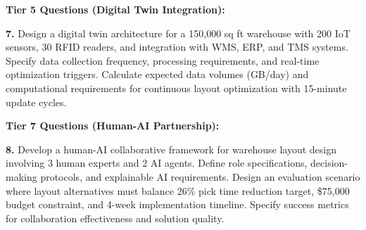\documentclass{article}
\begin{document}
\textbf{Tier 5 Questions (Digital Twin Integration):}

\textbf{7.} Design a digital twin architecture for a 150,000 sq ft warehouse with 200 IoT sensors, 30 RFID readers, and integration with WMS, ERP, and TMS systems. Specify data collection frequency, processing requirements, and real-time optimization triggers. Calculate expected data volumes (GB/day) and computational requirements for continuous layout optimization with 15-minute update cycles.

\textbf{Tier 7 Questions (Human-AI Partnership):}

\textbf{8.} Develop a human-AI collaborative framework for warehouse layout design involving 3 human experts and 2 AI agents. Define role specifications, decision-making protocols, and explainable AI requirements. Design an evaluation scenario where layout alternatives must balance 26\% pick time reduction target, \$75,000 budget constraint, and 4-week implementation timeline. Specify success metrics for collaboration effectiveness and solution quality.
\end{document}
